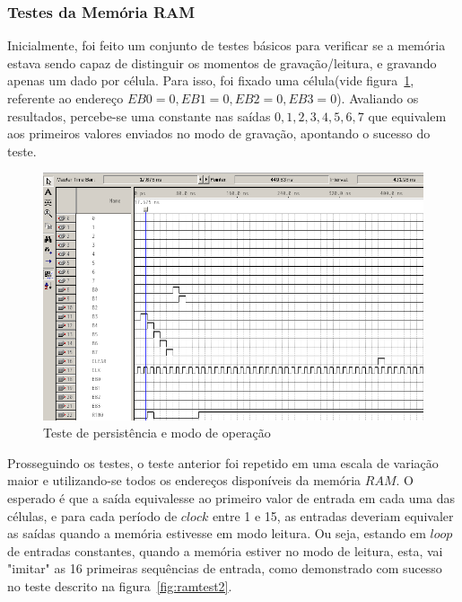 \documentclass[12pt]{article}
\begin{document}
\subsubsection{Testes da Memória RAM}

Inicialmente, foi feito um conjunto de testes básicos para verificar se a memória estava sendo capaz de distinguir os momentos de gravação/leitura, e gravando apenas um dado por célula. Para isso, foi fixado uma célula(vide figura~\ref{fig:ramtest}, referente ao endereço $EB0=0, EB1=0, EB2=0, EB3=0$). Avaliando os resultados, percebe-se uma constante nas saídas $0,1,2,3,4,5,6,7$ que equivalem aos primeiros valores enviados no modo de gravação, apontando o sucesso do teste.

\begin{figure}[h]
\centering
\includegraphics[width=1\textwidth]{img/testram1.png}
\caption{Teste de persistência e modo de operação}
\label{fig:ramtest}
\end{figure}

Prosseguindo os testes, o teste anterior foi repetido em uma escala de variação maior e utilizando-se todos os endereços disponíveis da memória $RAM$. O esperado é que a saída equivalesse ao primeiro valor de entrada em cada uma das células, e para cada período de $clock$ entre 1 e 15, as entradas deveriam equivaler as saídas quando a memória estivesse em modo leitura. Ou seja, estando em $loop$ de entradas constantes, quando a memória estiver no modo de leitura, esta, vai "imitar" as 16 primeiras sequências de entrada, como demonstrado com sucesso no teste descrito na figura~\ref{fig:ramtest2}.
\end{document}
